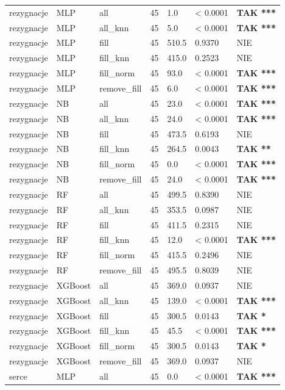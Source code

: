\begin{table}[htbp]
\begin{tabular}{lllrlll}
rezygnacje & MLP & all & 45 & 1.0 & < 0.0001 & \textbf{TAK ***} \\
rezygnacje & MLP & all_knn & 45 & 5.0 & < 0.0001 & \textbf{TAK ***} \\
rezygnacje & MLP & fill & 45 & 510.5 & 0.9370 & NIE \\
rezygnacje & MLP & fill_knn & 45 & 415.0 & 0.2523 & NIE \\
rezygnacje & MLP & fill_norm & 45 & 93.0 & < 0.0001 & \textbf{TAK ***} \\
rezygnacje & MLP & remove_fill & 45 & 6.0 & < 0.0001 & \textbf{TAK ***} \\
rezygnacje & NB & all & 45 & 23.0 & < 0.0001 & \textbf{TAK ***} \\
rezygnacje & NB & all_knn & 45 & 24.0 & < 0.0001 & \textbf{TAK ***} \\
rezygnacje & NB & fill & 45 & 473.5 & 0.6193 & NIE \\
rezygnacje & NB & fill_knn & 45 & 264.5 & 0.0043 & \textbf{TAK **} \\
rezygnacje & NB & fill_norm & 45 & 0.0 & < 0.0001 & \textbf{TAK ***} \\
rezygnacje & NB & remove_fill & 45 & 24.0 & < 0.0001 & \textbf{TAK ***} \\
rezygnacje & RF & all & 45 & 499.5 & 0.8390 & NIE \\
rezygnacje & RF & all_knn & 45 & 353.5 & 0.0987 & NIE \\
rezygnacje & RF & fill & 45 & 411.5 & 0.2315 & NIE \\
rezygnacje & RF & fill_knn & 45 & 12.0 & < 0.0001 & \textbf{TAK ***} \\
rezygnacje & RF & fill_norm & 45 & 415.5 & 0.2496 & NIE \\
rezygnacje & RF & remove_fill & 45 & 495.5 & 0.8039 & NIE \\
rezygnacje & XGBoost & all & 45 & 369.0 & 0.0937 & NIE \\
rezygnacje & XGBoost & all_knn & 45 & 139.0 & < 0.0001 & \textbf{TAK ***} \\
rezygnacje & XGBoost & fill & 45 & 300.5 & 0.0143 & \textbf{TAK *} \\
rezygnacje & XGBoost & fill_knn & 45 & 45.5 & < 0.0001 & \textbf{TAK ***} \\
rezygnacje & XGBoost & fill_norm & 45 & 300.5 & 0.0143 & \textbf{TAK *} \\
rezygnacje & XGBoost & remove_fill & 45 & 369.0 & 0.0937 & NIE \\
serce & MLP & all & 45 & 0.0 & < 0.0001 & \textbf{TAK ***} \\

\end{tabular}
\end{table}
